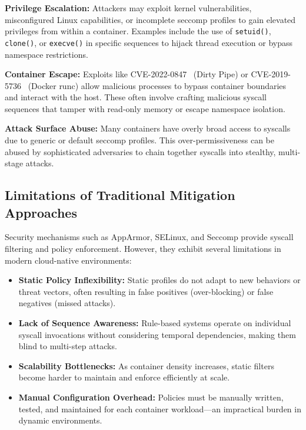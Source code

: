 \textbf{Privilege Escalation:} Attackers may exploit kernel vulnerabilities, misconfigured Linux
capabilities, or incomplete seccomp profiles to gain elevated privileges from within a container.
Examples include the use of \texttt{setuid()}, \texttt{clone()}, or \texttt{execve()} in
specific sequences to hijack thread execution or bypass namespace restrictions.

\textbf{Container Escape:} Exploits like \mbox{CVE-2022-0847}~\cite{cve_2022_0847} (Dirty Pipe)
or \mbox{CVE-2019-5736}~\cite{cve_2019_5736} (Docker runc) allow malicious processes to bypass
container boundaries and interact with the host. These often involve crafting malicious syscall
sequences that tamper with read-only memory or escape namespace isolation.

\textbf{Attack Surface Abuse:} Many containers have overly broad access to syscalls due to
generic or default seccomp profiles. This over-permissiveness can be abused by sophisticated
adversaries to chain together syscalls into stealthy, multi-stage attacks.

\subsection{Limitations of Traditional Mitigation Approaches}
\label{subsec:traditional_limitations}

Security mechanisms such as AppArmor, SELinux, and Seccomp provide syscall filtering and policy
enforcement. However, they exhibit several limitations in modern cloud-native environments:

\begin{itemize}
  \item \textbf{Static Policy Inflexibility:} Static profiles do not adapt to new behaviors or
        threat vectors, often resulting in false positives (over-blocking) or false negatives
        (missed attacks).
  \item \textbf{Lack of Sequence Awareness:} Rule-based systems operate on individual syscall
        invocations without considering temporal dependencies, making them blind to multi-step
        attacks.
  \item \textbf{Scalability Bottlenecks:} As container density increases, static filters become
        harder to maintain and enforce efficiently at scale.
  \item \textbf{Manual Configuration Overhead:} Policies must be manually written, tested, and
        maintained for each container workload---an impractical burden in dynamic environments.
\end{itemize}

